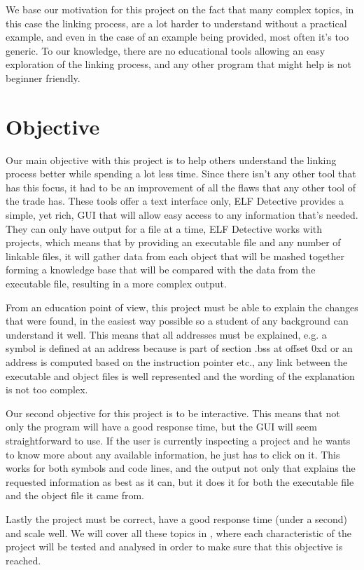 We base our  motivation for this project on the fact that many complex topics, in this case the linking process, are a lot harder to understand without a practical example, and even in the case of an example being provided, most often it's too generic. To our knowledge, there are no educational tools allowing an easy exploration of the linking process, and any other program that might help is not beginner friendly.

\section{Objective}
\label{sec:obj}

Our main objective with this project is to help others understand the linking process better while spending a lot less time. Since there isn't any other tool that has this focus, it had to be an improvement of all the flaws that any other tool of the trade has. These tools offer a text interface only, ELF Detective provides a simple, yet rich, GUI that will allow easy access to any information that's needed. They can only have output for a file at a time, ELF Detective works with projects, which means that by providing an executable file and any number of linkable files, it will gather data from each object that will be mashed together forming a knowledge base that will be compared with the data from the executable file, resulting in a more complex output.

From an education point of view, this project must be able to explain the changes that were found, in the easiest way possible so a student of any background can understand it well. This means that all addresses must be explained, e.g. a symbol is defined at an address because is part of section .bss at offset 0xd or an address is computed based on the instruction pointer etc., any link between the executable and object files is well represented and the wording of the explanation is not too complex.

Our second objective for this project is to be interactive. This means that not only the program will have a good response time, but the GUI will seem straightforward to use. If the user is currently inspecting a project and he wants to know more about any available information, he just has to click on it. This works for both symbols and code lines, and the output not only that explains the requested information as best as it can, but it does it for both the executable file and the object file it came from.

Lastly the project must be correct, have a good response time (under a second) and scale well. We will cover all these topics in , where each characteristic of the project will be tested and analysed in order to make sure that this objective is reached.
